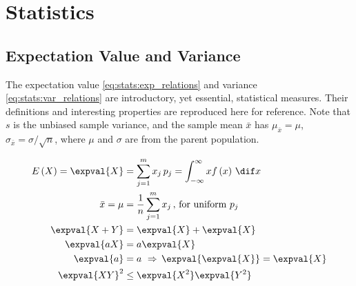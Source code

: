 \section{Statistics}
\label{additional:stats}

\subsection{Expectation Value and Variance}
\label{additional:stats:expval_and_var}

The expectation value \cref{eq:stats:exp_relations} and variance \cref{eq:stats:var_relations} are introductory, yet essential, statistical measures.
Their definitions and interesting properties are reproduced here for reference.
Note that $s$ is the unbiased sample variance,
and the sample mean $\bar{x}$ has $\mu_{\bar{x}} = \mu$, $\sigma_{\bar{x}} = \sigma / \sqrt{n}$,
where $\mu$ and $\sigma$ are from the parent population.

\begin{subequations}\label{eq:stats:exp_relations}
\begin{align}
E\left(X\right) = \expval{X} &= \sum_{j=1}^{m} x_{j} \, p_{j} = \int_{-\infty}^{\infty} x f\left(x\right) \, \dif x \label{eq:stats:exp_relations:def} \\
\bar{x} = \mu &= \frac{1}{n} \sum_{j=1}^{m} x_{j}\,,\,\text{for uniform}~p_{j} \label{eq:stats:exp_relations:mean} \\
\expval{X+Y} &= \expval{X} + \expval{X} \label{eq:stats:exp_relations:add} \\
\expval{a X} &= a \expval{X} \label{eq:stats:exp_relations:mult} \\
\expval{a} &= a \,\, \Rightarrow \, \expval{\expval{X}} = \expval{X} \label{eq:stats:exp_relations:self} \\
\expval{X Y}^{2} &\leq \expval{X^{2}} \expval{Y^{2}} \label{eq:stats:exp_relations:cbs_ineq}
\end{align}
\end{subequations}

